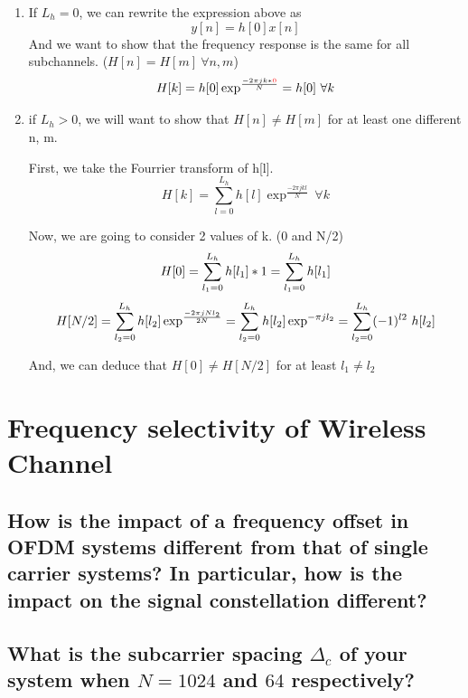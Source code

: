 \documentclass[frenchb, oneside, headings=normal]{scrartcl}
\begin{document}
\begin{enumerate}

\item If $L_h=0$, we can rewrite the expression above as
\begin{equation}
y[n]=h[0]x[n]
\end{equation}
And we want to show that the frequency response is the same for all subchannels. ($H[n]=H[m]~\forall n,m$)
\begin{equation}
H[k]=h[0]\exp^{\frac{-2\pi jk*\color{red} 0}{N}}=h[0]~\forall k
\end{equation} 

\item if $L_h>0$, we will want to show that $H[n] \neq H[m]$ for at least one different n, m.

First, we take the Fourrier transform of h[l].
\begin{equation}
H[k]=\sum_{l=0}^{L_h} h[l]\exp^{\frac{-2\pi jkl}{N}}~\forall k
\end{equation}

Now, we are going to consider 2 values of k. (0 and N/2)
\begin{equation}
H[0]=\sum_{l_1=0}^{L_h} h[l_1]*1=\sum_{l_1=0}^{L_h} h[l_1]\\
\end{equation}
\begin{equation}
H[N/2]=\sum_{l_2=0}^{L_h} h[l_2]\exp^{\frac{-2\pi jNl_2}{2N}}=\sum_{l_2=0}^{L_h} h[l_2]\exp^{-\pi jl_2}=\sum_{l_2=0}^{L_h} (-1)^{l2}~h[l_2]\\
\end{equation}

And, we can deduce that $H[0]\neq H[N/2]$ for at least $l_1\neq l_2$

\end{enumerate}

\newpage

\section{Frequency selectivity of Wireless Channel}

\subsection{How is the impact of a frequency offset in OFDM systems different from that of single carrier systems? In particular, how is the impact on the signal constellation different?}

\subsection{What is the subcarrier spacing $\Delta_c$ of your system when $N = 1024$ and $64$ respectively?}
\end{document}
